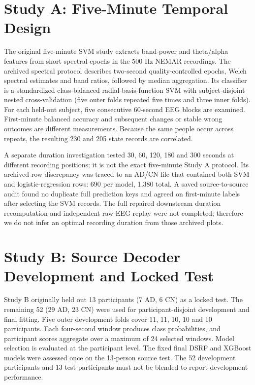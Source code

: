 \section{Study A: Five-Minute Temporal Design}
The original five-minute SVM study extracts band-power and theta/alpha features from short spectral epochs in the 500 Hz NEMAR recordings. The archived spectral protocol describes two-second quality-controlled epochs, Welch spectral estimates and band ratios, followed by median aggregation. Its classifier is a standardized class-balanced radial-basis-function SVM with subject-disjoint nested cross-validation (five outer folds repeated five times and three inner folds). For each held-out subject, five consecutive 60-second EEG blocks are examined. First-minute balanced accuracy and subsequent changes or stable wrong outcomes are different measurements. Because the same people occur across repeats, the resulting 230 and 205 state records are correlated.

A separate duration investigation tested 30, 60, 120, 180 and 300 seconds at different recording positions; it is not the exact five-minute Study A protocol. Its archived row discrepancy was traced to an AD/CN file that contained both SVM and logistic-regression rows: 690 per model, 1,380 total. A saved source-to-source audit found no duplicate full prediction keys and agreed on first-minute labels after selecting the SVM records. The full repaired downstream duration recomputation and independent raw-EEG replay were not completed; therefore we do not infer an optimal recording duration from those archived plots.

\section{Study B: Source Decoder Development and Locked Test}
Study B originally held out 13 participants (7 AD, 6 CN) as a locked test. The remaining 52 (29 AD, 23 CN) were used for participant-disjoint development and final fitting. Five outer development folds cover 11, 11, 10, 10 and 10 participants. Each four-second window produces class probabilities, and participant scores aggregate over a maximum of 24 selected windows. Model selection is evaluated at the participant level. The fixed final DSRF and XGBoost models were assessed once on the 13-person source test. The 52 development participants and 13 test participants must not be blended to report development performance.

